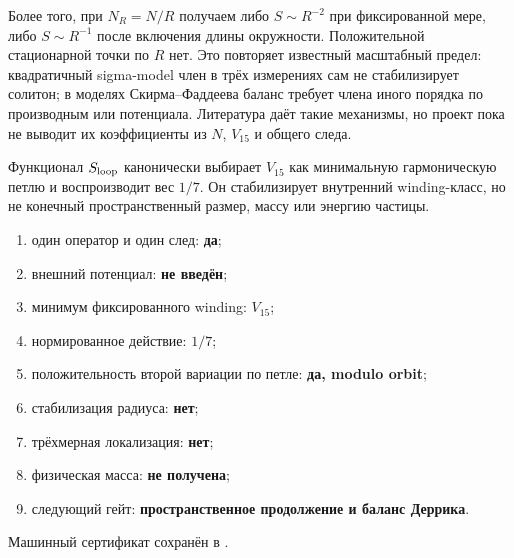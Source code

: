 Более того, при $N_R=N/R$ получаем либо $S\sim R^{-2}$ при фиксированной
мере, либо $S\sim R^{-1}$ после включения длины окружности. Положительной
стационарной точки по $R$ нет. Это повторяет известный масштабный предел:
квадратичный sigma-model член в трёх измерениях сам не стабилизирует
солитон; в моделях Скирма--Фаддеева баланс требует члена иного порядка по
производным или потенциала. Литература даёт такие механизмы, но проект
пока не выводит их коэффициенты из $N$, $V_{15}$ и общего следа.

\begin{theorem}
Функционал $S_{\rm loop}$ канонически выбирает $V_{15}$ как минимальную
гармоническую петлю и воспроизводит вес $1/7$. Он стабилизирует внутренний
winding-класс, но не конечный пространственный размер, массу или энергию
частицы.
\end{theorem}

\begin{protocol}
\begin{enumerate}
 \item один оператор и один след: \textbf{да};
 \item внешний потенциал: \textbf{не введён};
 \item минимум фиксированного winding: \textbf{$V_{15}$};
 \item нормированное действие: \textbf{$1/7$};
 \item положительность второй вариации по петле: \textbf{да, modulo orbit};
 \item стабилизация радиуса: \textbf{нет};
 \item трёхмерная локализация: \textbf{нет};
 \item физическая масса: \textbf{не получена};
 \item следующий гейт: \textbf{пространственное продолжение и баланс Деррика}.
\end{enumerate}
\end{protocol}

Машинный сертификат сохранён в
.